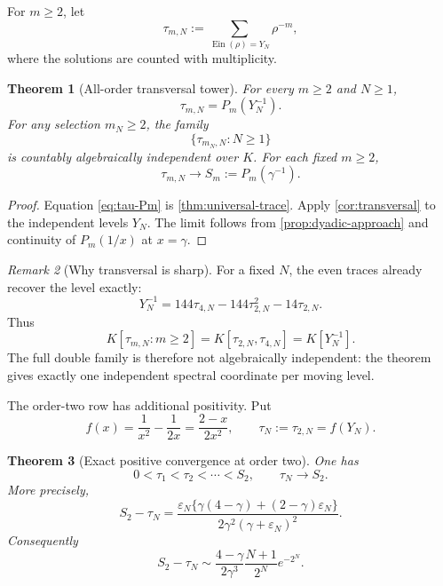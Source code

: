 \documentclass[11pt]{article}
\theoremstyle{keio}
\newtheorem{theorem}{Theorem}[section]
\theoremstyle{definition}
\theoremstyle{remark}
\newtheorem{remark}[theorem]{Remark}
\newcommand{\Ein}{\operatorname{Ein}}
\begin{document}
For \(m\ge2\), let
\begin{equation}\label{eq:tau-mN}
 \tau_{m,N}:=\sum_{\Ein(\rho)=Y_N}\rho^{-m},
\end{equation}
where the solutions are counted with multiplicity.

\begin{theorem}[All-order transversal tower]
\label{thm:all-order-tower}
For every \(m\ge2\) and \(N\ge1\),
\begin{equation}\label{eq:tau-Pm}
 \tau_{m,N}=P_m(Y_N^{-1}).
\end{equation}
For any selection \(m_N\ge2\), the family
\[
 \{\tau_{m_N,N}:N\ge1\}
\]
is countably algebraically independent over \(K\).  For each fixed
\(m\ge2\),
\begin{equation}\label{eq:tau-limit}
 \tau_{m,N}\longrightarrow S_m:=P_m(\gamma^{-1}).
\end{equation}
\end{theorem}

\begin{proof}
Equation \eqref{eq:tau-Pm} is \cref{thm:universal-trace}.  Apply
\cref{cor:transversal} to the independent levels \(Y_N\).  The limit follows
from \cref{prop:dyadic-approach} and continuity of \(P_m(1/x)\) at
\(x=\gamma\).
\end{proof}

\begin{remark}[Why transversal is sharp]
For a fixed \(N\), the even traces already recover the level exactly:
\begin{equation}\label{eq:YN-even-recovery}
 \boxed{\displaystyle
 Y_N^{-1}=144\tau_{4,N}-144\tau_{2,N}^2-14\tau_{2,N}.}
\end{equation}
Thus
\[
 K[\tau_{m,N}:m\ge2]
 =K[\tau_{2,N},\tau_{4,N}]
 =K[Y_N^{-1}].
\]
The full double family is therefore not algebraically independent: the
theorem gives exactly one independent spectral coordinate per moving level.
\end{remark}

The order-two row has additional positivity.  Put
\begin{equation}\label{eq:f-def}
 f(x)=\frac1{x^2}-\frac1{2x}=\frac{2-x}{2x^2},
 \qquad \tau_N:=\tau_{2,N}=f(Y_N).
\end{equation}

\begin{theorem}[Exact positive convergence at order two]
\label{thm:tau2-convergence}
One has
\[
 0<\tau_1<\tau_2<\cdots<S_2,
 \qquad \tau_N\longrightarrow S_2.
\]
More precisely,
\begin{equation}\label{eq:S2-tail-exact}
 \boxed{\displaystyle
 S_2-\tau_N=
 \frac{\varepsilon_N
 \{\gamma(4-\gamma)+(2-\gamma)\varepsilon_N\}}
 {2\gamma^2(\gamma+\varepsilon_N)^2}.}
\end{equation}
Consequently
\begin{equation}\label{eq:S2-tail-asymptotic}
 S_2-\tau_N\sim
 \frac{4-\gamma}{2\gamma^3}
 \frac{N+1}{2^N}e^{-2^N}.
\end{equation}
\end{theorem}
\end{document}

